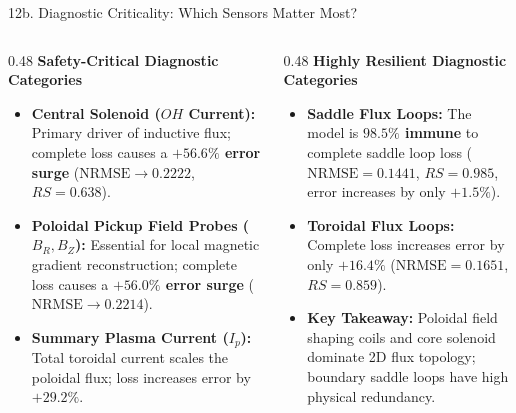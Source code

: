 \documentclass[aspectratio=169, 10pt]{beamer}
\begin{document}
\begin{frame}{12b. Diagnostic Criticality: Which Sensors Matter Most?}
  \begin{columns}[T]
    \begin{column}{0.48\textwidth}
      \textbf{\color{NavyBlue} Safety-Critical Diagnostic Categories}
      \begin{itemize}
        \item \textbf{Central Solenoid ($OH$ Current):}
          Primary driver of inductive flux; complete loss causes a \textbf{$+56.6\%$ error surge} ($\text{NRMSE} \to 0.2222$, $RS = 0.638$).
        \item \textbf{Poloidal Pickup Field Probes ($B_R, B_Z$):}
          Essential for local magnetic gradient reconstruction; complete loss causes a \textbf{$+56.0\%$ error surge} ($\text{NRMSE} \to 0.2214$).
        \item \textbf{Summary Plasma Current ($I_p$):}
          Total toroidal current scales the poloidal flux; loss increases error by \textbf{$+29.2\%$}.
      \end{itemize}
    \end{column}

    \begin{column}{0.48\textwidth}
      \textbf{\color{NavyBlue} Highly Resilient Diagnostic Categories}
      \begin{itemize}
        \item \textbf{Saddle Flux Loops:}
          The model is \textbf{$98.5\%$ immune} to complete saddle loop loss ($\text{NRMSE} = 0.1441$, $RS = 0.985$, error increases by only $+1.5\%$).
        \item \textbf{Toroidal Flux Loops:}
          Complete loss increases error by only $+16.4\%$ ($\text{NRMSE} = 0.1651$, $RS = 0.859$).
        \item \textbf{Key Takeaway:}
          Poloidal field shaping coils and core solenoid dominate 2D flux topology; boundary saddle loops have high physical redundancy.
      \end{itemize}
    \end{column}
  \end{columns}
\end{frame}
\end{document}
